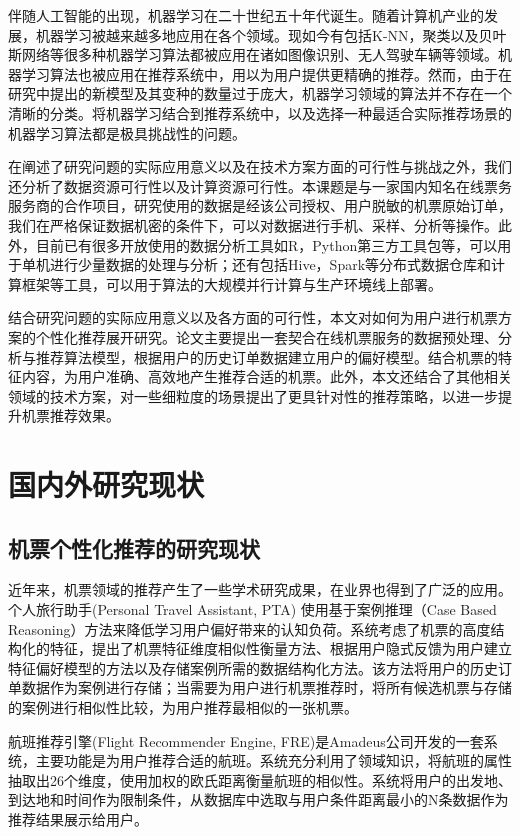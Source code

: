 伴随人工智能的出现，机器学习在二十世纪五十年代诞生\parencite{portugal2015use}。随着计算机产业的发展，机器学习被越来越多地应用在各个领域。现如今有包括K-NN，聚类以及贝叶斯网络等很多种机器学习算法都被应用在诸如图像识别、无人驾驶车辆等领域。机器学习算法也被应用在推荐系统中，用以为用户提供更精确的推荐。然而，由于在研究中提出的新模型及其变种的数量过于庞大，机器学习领域的算法并不存在一个清晰的分类。将机器学习结合到推荐系统中，以及选择一种最适合实际推荐场景的机器学习算法都是极具挑战性的问题。

在阐述了研究问题的实际应用意义以及在技术方案方面的可行性与挑战之外，我们还分析了数据资源可行性以及计算资源可行性。本课题是与一家国内知名在线票务服务商的合作项目，研究使用的数据是经该公司授权、用户脱敏的机票原始订单，我们在严格保证数据机密的条件下，可以对数据进行手机、采样、分析等操作。此外，目前已有很多开放使用的数据分析工具如R，Python第三方工具包等，可以用于单机进行少量数据的处理与分析；还有包括Hive，Spark等分布式数据仓库和计算框架等工具，可以用于算法的大规模并行计算与生产环境线上部署。

结合研究问题的实际应用意义以及各方面的可行性，本文对如何为用户进行机票方案的个性化推荐展开研究。论文主要提出一套契合在线机票服务的数据预处理、分析与推荐算法模型，根据用户的历史订单数据建立用户的偏好模型。结合机票的特征内容，为用户准确、高效地产生推荐合适的机票。此外，本文还结合了其他相关领域的技术方案，对一些细粒度的场景提出了更具针对性的推荐策略，以进一步提升机票推荐效果。

\section{国内外研究现状}
\subsection{机票个性化推荐的研究现状}
近年来，机票领域的推荐产生了一些学术研究成果，在业界也得到了广泛的应用。个人旅行助手(Personal Travel Assistant, PTA)\parencite{coyle2004making} 使用基于案例推理（Case Based Reasoning）\parencite{aamodt1994case,kolodner2014case}方法来降低学习用户偏好带来的认知负荷。系统考虑了机票的高度结构化的特征，提出了机票特征维度相似性衡量方法、根据用户隐式反馈为用户建立特征偏好模型的方法以及存储案例所需的数据结构化方法。该方法将用户的历史订单数据作为案例进行存储；当需要为用户进行机票推荐时，将所有候选机票与存储的案例进行相似性比较，为用户推荐最相似的一张机票。

航班推荐引擎(Flight Recommender Engine, FRE)\parencite{barth2014design}是Amadeus公司开发的一套系统，主要功能是为用户推荐合适的航班。系统充分利用了领域知识，将航班的属性抽取出26个维度，使用加权的欧氏距离衡量航班的相似性。系统将用户的出发地、到达地和时间作为限制条件，从数据库中选取与用户条件距离最小的N条数据作为推荐结果展示给用户。

